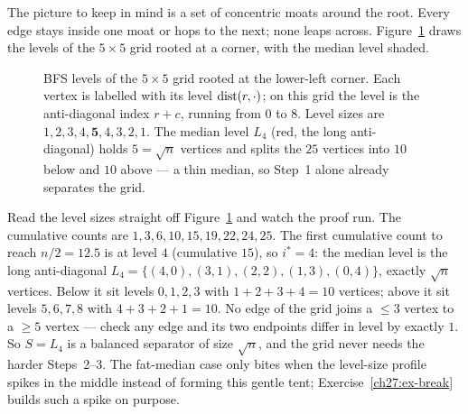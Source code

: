 The picture to keep in mind is a set of concentric moats around the root. Every edge stays inside one moat or hops to the next; none leaps across. Figure~\ref{ch27:fig-bfs} draws the levels of the $5\times5$ grid rooted at a corner, with the median level shaded.

\begin{figure}[H]
\centering
{}
\caption{BFS levels of the $5\times5$ grid rooted at the lower-left corner. Each vertex is labelled with its level $\operatorname{dist}(r,\cdot)$; on this grid the level is the anti-diagonal index $r+c$, running from $0$ to $8$. Level sizes are $1,2,3,4,\mathbf 5,4,3,2,1$. The median level $L_4$ (red, the long anti-diagonal) holds $5=\sqrt n$ vertices and splits the $25$ vertices into $10$ below and $10$ above --- a thin median, so Step~1 alone already separates the grid.}
\label{ch27:fig-bfs}
\end{figure}

\begin{labbox}
Read the level sizes straight off Figure~\ref{ch27:fig-bfs} and watch the proof run. The cumulative counts are $1,3,6,10,15,19,22,24,25$. The first cumulative count to reach $n/2=12.5$ is at level $4$ (cumulative $15$), so $i^*=4$: the median level is the long anti-diagonal $L_4=\{(4,0),(3,1),(2,2),(1,3),(0,4)\}$, exactly $\sqrt n$ vertices. Below it sit levels $0,1,2,3$ with $1+2+3+4=10$ vertices; above it sit levels $5,6,7,8$ with $4+3+2+1=10$. No edge of the grid joins a $\le 3$ vertex to a $\ge 5$ vertex --- check any edge and its two endpoints differ in level by exactly $1$. So $S=L_4$ is a balanced separator of size $\sqrt n$, and the grid never needs the harder Steps~2--3. The fat-median case only bites when the level-size profile spikes in the middle instead of forming this gentle tent; Exercise~\ref{ch27:ex-break} builds such a spike on purpose.
\end{labbox}

